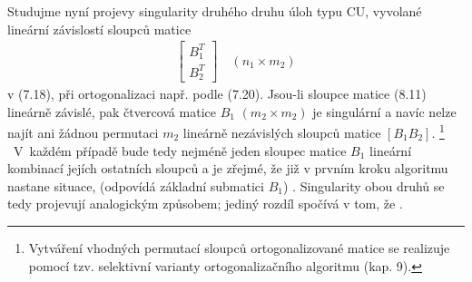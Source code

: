 Studujme nyní projevy singularity druhého druhu úloh typu
CU, vyvolané lineární závislostí sloupců matice
%
\begin{align*}
  \tag{8.11}
  \left[
    \begin{array}{c}
      B_1^T \\ B_2^T
    \end{array}
    \right]
    \quad
    (n_1 \times m_2)
\end{align*}
%
v (7.18), při ortogonalizaci např. podle (7.20). Jsou-li sloupce
matice (8.11) lineárně závislé, pak čtvercová matice $B_1$ $(m_2
\times m_2)$ je singulární a navíc nelze najít ani žádnou permutaci
$m_2$ lineárně nezávislých sloupců matice $[ B_1 B_2 ]$.%
%
\footnote{ Vytváření vhodných permutací sloupců ortogonalizované
	matice se realizuje pomocí tzv. selektivní varianty
	ortogonalizačního algoritmu (kap. 9).}%
%
~V~každém případě bude tedy nejméně jeden sloupec matice $B_1$
lineární kombinací jejích ostatních sloupců a je zřejmé, že již v
prvním kroku algoritmu nastane situace,  (odpovídá základní submatici $B_1$)
. Singularity obou druhů se tedy projevují
analogickým způsobem; jediný rozdíl spočívá v tom,
%
 že .



